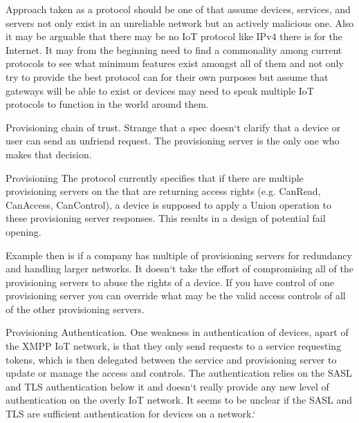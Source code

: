 Approach taken as a protocol should be one of that assume devices, services, and
servers not only exist in an unreliable network but an actively malicious one.
Also it may be arguable that there may be no IoT protocol like IPv4 there is for
the Internet. It may from the beginning need to find a commonality among current
protocols to see what minimum features exist amongst all of them and not only
try to provide the best protocol can for their own purposes but assume that
gateways will be able to exist or devices may need to speak multiple IoT
protocols to function in the world around them. 

Provisioning chain of trust. Strange that a spec doesn`t clarify that a device
or user can send an unfriend request. The provisioning server is the only one
who makes that decision.

Provisioning The protocol currently specifies that if there are multiple
provisioning servers on the that are returning access rights (e.g.  CanRead,
CanAccess, CanControl), a device is supposed to apply a Union operation to these
provisioning server responses. This results in a design of potential fail
opening.

Example then is if a company has multiple of provisioning servers for
redundancy and handling larger networks. It doesn`t take the effort of
compromising all of the provisioning servers to abuse the rights of a
device. If you have control of one provisioning server you can override what
may be the valid access controls of all of the other provisioning servers.

Provisioning Authentication. One weakness in authentication of devices,
apart of the XMPP IoT network, is that they only send requests to a service
requesting tokens, which is then delegated between the service and
provisioning server to update or manage the access and controls. The
authentication relies on the SASL and TLS authentication below it and
doesn`t really provide any new level of authentication on the overly IoT
network. It seems to be unclear if the SASL and TLS are sufficient
authentication for devices on a network.`
